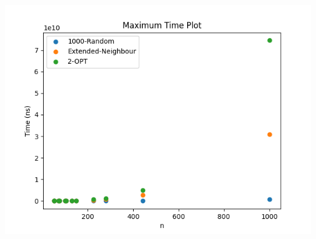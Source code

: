 \documentclass{article}
\begin{document}
\begin{center}
\includegraphics[width=\textwidth, 
                   height = 0.4\textheight, 
                   keepaspectratio]
                  {tsp_lib_max_time} 
\end{center}
\end{document}
